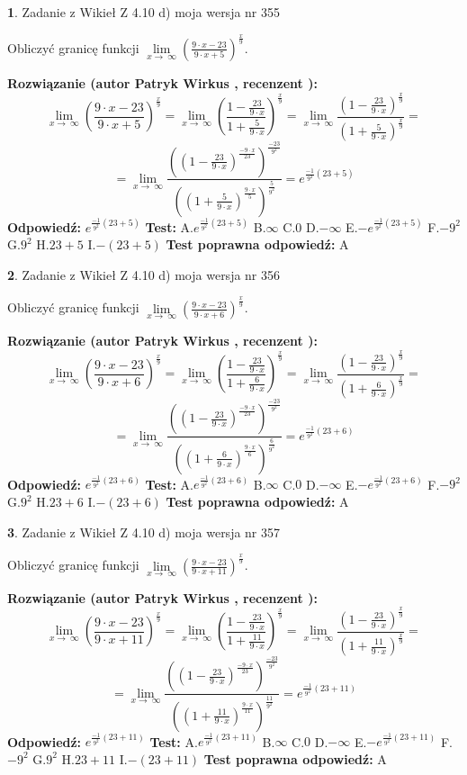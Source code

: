 \documentclass[12pt, a4paper]{article}
\theoremstyle{definition} %
\newtheorem{zad}{}
\newcommand{\zadStart}[1]{\begin{zad}#1\newline}
\newcommand{\zadStop}{\end{zad}}
\newcommand{\rozwStart}[2]{\noindent \textbf{Rozwiązanie (autor #1 , recenzent #2): }\newline}
\newcommand{\rozwStop}{\newline}
\newcommand{\odpStart}{\noindent \textbf{Odpowiedź:}\newline}
\newcommand{\odpStop}{\newline}
\newcommand{\testStart}{\noindent \textbf{Test:}\newline}
\newcommand{\testStop}{\newline}
\newcommand{\kluczStart}{\noindent \textbf{Test poprawna odpowiedź:}\newline}
\newcommand{\kluczStop}{\newline}
\begin{document}
\zadStart{Zadanie z Wikieł Z 4.10 d) moja wersja nr 355}


Obliczyć granicę funkcji  $\lim\limits_{x\to\ \infty}(\frac{9\cdot x-23}{9\cdot x+5})^{\frac{x}{9}}$.
\zadStop
\rozwStart{Patryk Wirkus}{}
$$\lim\limits_{x\to\ \infty}(\frac{9\cdot x-23}{9\cdot x+5})^{\frac{x}{9}} = \lim\limits_{x\to\ \infty}(\frac{1-\frac{23}{9\cdot x}}{1+\frac{5}{9\cdot x}})^{\frac{x}{9}}=\lim\limits_{x\to\ \infty}\frac{(1-\frac{23}{9\cdot x})^{\frac{x}{9}}}{(1+\frac{5}{9\cdot x})^{\frac{x}{9}}}=$$
$$=\lim\limits_{x\to\ \infty}\frac{((1-\frac{23}{9\cdot x})^{\frac{-9\cdot x}{23}})^{\frac{-23}{9^{2}}}}{((1+\frac{5}{9\cdot x})^{\frac{9\cdot x}{5}})^{\frac{5}{9^{2}}}}=e^{\frac{-1}{9^{2}}(23+5)}$$
\rozwStop
\odpStart
$e^{\frac{-1}{9^{2}}(23+5)}$
\odpStop
\testStart
A.$e^{\frac{-1}{9^{2}}(23+5)}$ B.$\infty$ C.$0$ D.$-\infty$ E.$-e^{\frac{-1}{9^{2}}(23+5)}$
F.$-9^{2}$ G.$9^{2}$
H.$23+5$
I.$-(23+5)$
\testStop
\kluczStart
A
\kluczStop



\zadStart{Zadanie z Wikieł Z 4.10 d) moja wersja nr 356}


Obliczyć granicę funkcji  $\lim\limits_{x\to\ \infty}(\frac{9\cdot x-23}{9\cdot x+6})^{\frac{x}{9}}$.
\zadStop
\rozwStart{Patryk Wirkus}{}
$$\lim\limits_{x\to\ \infty}(\frac{9\cdot x-23}{9\cdot x+6})^{\frac{x}{9}} = \lim\limits_{x\to\ \infty}(\frac{1-\frac{23}{9\cdot x}}{1+\frac{6}{9\cdot x}})^{\frac{x}{9}}=\lim\limits_{x\to\ \infty}\frac{(1-\frac{23}{9\cdot x})^{\frac{x}{9}}}{(1+\frac{6}{9\cdot x})^{\frac{x}{9}}}=$$
$$=\lim\limits_{x\to\ \infty}\frac{((1-\frac{23}{9\cdot x})^{\frac{-9\cdot x}{23}})^{\frac{-23}{9^{2}}}}{((1+\frac{6}{9\cdot x})^{\frac{9\cdot x}{6}})^{\frac{6}{9^{2}}}}=e^{\frac{-1}{9^{2}}(23+6)}$$
\rozwStop
\odpStart
$e^{\frac{-1}{9^{2}}(23+6)}$
\odpStop
\testStart
A.$e^{\frac{-1}{9^{2}}(23+6)}$ B.$\infty$ C.$0$ D.$-\infty$ E.$-e^{\frac{-1}{9^{2}}(23+6)}$
F.$-9^{2}$ G.$9^{2}$
H.$23+6$
I.$-(23+6)$
\testStop
\kluczStart
A
\kluczStop



\zadStart{Zadanie z Wikieł Z 4.10 d) moja wersja nr 357}


Obliczyć granicę funkcji  $\lim\limits_{x\to\ \infty}(\frac{9\cdot x-23}{9\cdot x+11})^{\frac{x}{9}}$.
\zadStop
\rozwStart{Patryk Wirkus}{}
$$\lim\limits_{x\to\ \infty}(\frac{9\cdot x-23}{9\cdot x+11})^{\frac{x}{9}} = \lim\limits_{x\to\ \infty}(\frac{1-\frac{23}{9\cdot x}}{1+\frac{11}{9\cdot x}})^{\frac{x}{9}}=\lim\limits_{x\to\ \infty}\frac{(1-\frac{23}{9\cdot x})^{\frac{x}{9}}}{(1+\frac{11}{9\cdot x})^{\frac{x}{9}}}=$$
$$=\lim\limits_{x\to\ \infty}\frac{((1-\frac{23}{9\cdot x})^{\frac{-9\cdot x}{23}})^{\frac{-23}{9^{2}}}}{((1+\frac{11}{9\cdot x})^{\frac{9\cdot x}{11}})^{\frac{11}{9^{2}}}}=e^{\frac{-1}{9^{2}}(23+11)}$$
\rozwStop
\odpStart
$e^{\frac{-1}{9^{2}}(23+11)}$
\odpStop
\testStart
A.$e^{\frac{-1}{9^{2}}(23+11)}$ B.$\infty$ C.$0$ D.$-\infty$ E.$-e^{\frac{-1}{9^{2}}(23+11)}$
F.$-9^{2}$ G.$9^{2}$
H.$23+11$
I.$-(23+11)$
\testStop
\kluczStart
A
\kluczStop
\end{document}
